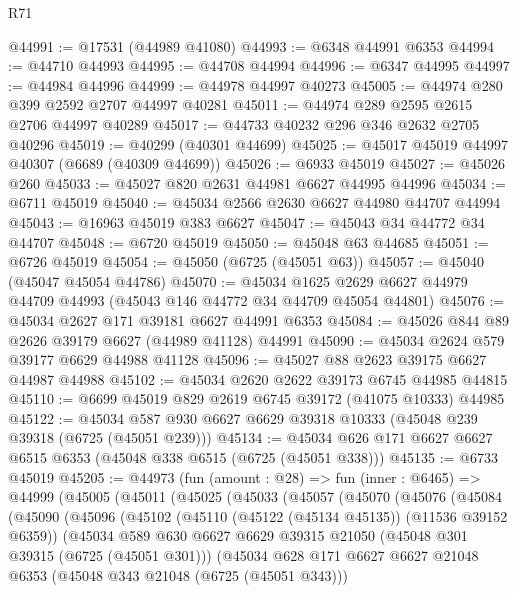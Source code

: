 \begin{lexlean}{R71}
\begin{coremodule}
@44991 := @17531 (@44989 @41080)
@44993 := @6348 @44991 @6353
@44994 := @44710 @44993
@44995 := @44708 @44994
@44996 := @6347 @44995
@44997 := @44984 @44996
@44999 := @44978 @44997 @40273
@45005 := @44974 @280 @399 @2592 @2707 @44997 @40281
@45011 := @44974 @289 @2595 @2615 @2706 @44997 @40289
@45017 := @44733 @40232 @296 @346 @2632 @2705 @40296
@45019 := @40299 (@40301 @44699)
@45025 := @45017 @45019 @44997 @40307 (@6689 (@40309 @44699))
@45026 := @6933 @45019
@45027 := @45026 @260
@45033 := @45027 @820 @2631 @44981 @6627 @44995 @44996
@45034 := @6711 @45019
@45040 := @45034 @2566 @2630 @6627 @44980 @44707 @44994
@45043 := @16963 @45019 @383 @6627
@45047 := @45043 @34 @44772 @34 @44707
@45048 := @6720 @45019
@45050 := @45048 @63 @44685
@45051 := @6726 @45019
@45054 := @45050 (@6725 (@45051 @63))
@45057 := @45040 (@45047 @45054 @44786)
@45070 := @45034
    @1625
    @2629
    @6627
    @44979
    @44709
    @44993
    (@45043 @146 @44772 @34 @44709 @45054 @44801)
@45076 := @45034 @2627 @171 @39181 @6627 @44991 @6353
@45084 := @45026 @844 @89 @2626 @39179 @6627 (@44989 @41128) @44991
@45090 := @45034 @2624 @579 @39177 @6629 @44988 @41128
@45096 := @45027 @88 @2623 @39175 @6627 @44987 @44988
@45102 := @45034 @2620 @2622 @39173 @6745 @44985 @44815
@45110 := @6699 @45019 @829 @2619 @6745 @39172 (@41075 @10333) @44985
@45122 := @45034 @587 @930 @6627 @6629 @39318 @10333 (@45048 @239 @39318 (@6725 (@45051 @239)))
@45134 := @45034 @626 @171 @6627 @6627 @6515 @6353 (@45048 @338 @6515 (@6725 (@45051 @338)))
@45135 := @6733 @45019
@45205 := @44973
    (fun (amount : @28) =>
    fun (inner : @6465) =>
    @44999
      (@45005
        (@45011
          (@45025
            (@45033
              (@45057
                (@45070
                  (@45076
                    (@45084
                      (@45090
                        (@45096
                          (@45102
                            (@45110 (@45122 (@45134 @45135)) (@11536 @39152 @6359))
                            (@45034
                              @589
                              @630
                              @6627
                              @6629
                              @39315
                              @21050
                              (@45048 @301 @39315 (@6725 (@45051 @301)))
                              (@45034
                                @628
                                @171
                                @6627
                                @6627
                                @21048
                                @6353
                                (@45048 @343 @21048 (@6725 (@45051 @343)))

\end{coremodule}
\end{lexlean}
